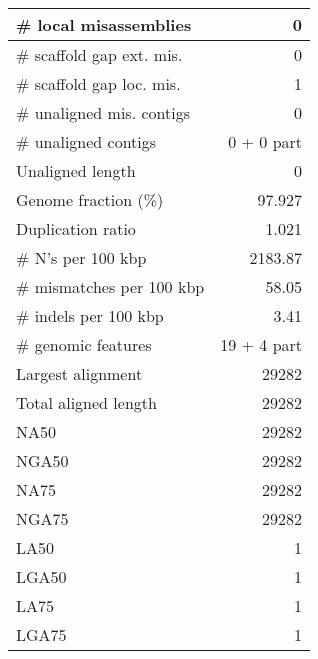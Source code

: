 \documentclass[12pt,a4paper]{article}
\begin{document}
\begin{table}[ht]
\begin{center}
\begin{tabular}{|l*{1}{|r}|}
\# local misassemblies & 0 \\ \hline
\# scaffold gap ext. mis. & 0 \\ \hline
\# scaffold gap loc. mis. & 1 \\ \hline
\# unaligned mis. contigs & 0 \\ \hline
\# unaligned contigs & 0 + 0 part \\ \hline
Unaligned length & 0 \\ \hline
Genome fraction (\%) & 97.927 \\ \hline
Duplication ratio & 1.021 \\ \hline
\# N's per 100 kbp & 2183.87 \\ \hline
\# mismatches per 100 kbp & 58.05 \\ \hline
\# indels per 100 kbp & 3.41 \\ \hline
\# genomic features & 19 + 4 part \\ \hline
Largest alignment & 29282 \\ \hline
Total aligned length & 29282 \\ \hline
NA50 & 29282 \\ \hline
NGA50 & 29282 \\ \hline
NA75 & 29282 \\ \hline
NGA75 & 29282 \\ \hline
LA50 & 1 \\ \hline
LGA50 & 1 \\ \hline
LA75 & 1 \\ \hline
LGA75 & 1 \\ \hline
\end{tabular}
\end{center}
\end{table}
\end{document}
